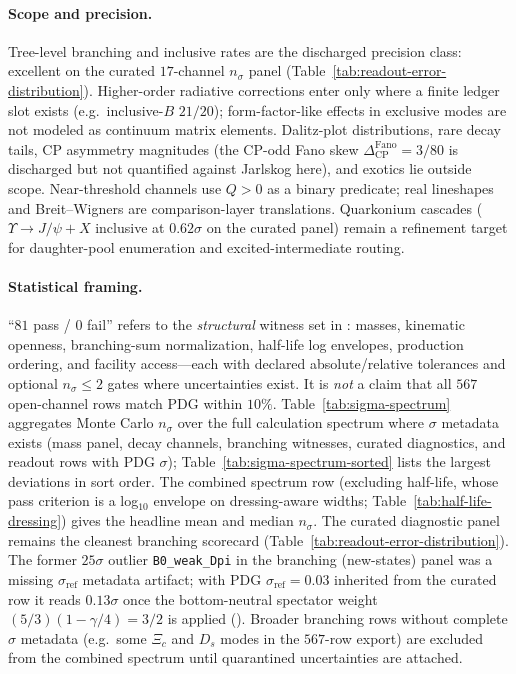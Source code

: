 \documentclass[11pt]{amsart}
\newcommand{\leanid}[1]{{\footnotesize\path{#1}}}
\begin{document}
\paragraph{Scope and precision.}
Tree-level branching and inclusive rates are the discharged precision class:
excellent on the curated $17$-channel $n_\sigma$ panel
(Table~\ref{tab:readout-error-distribution}).
Higher-order radiative corrections enter only where a finite ledger slot exists
(e.g.\ inclusive-$B$ $21/20$); form-factor-like effects in exclusive modes are not
modeled as continuum matrix elements.
Dalitz-plot distributions, rare decay tails, CP asymmetry magnitudes (the CP-odd
Fano skew $\Delta_{\mathrm{CP}}^{\mathrm{Fano}}=3/80$ is discharged but not
quantified against Jarlskog here), and exotics lie outside scope.
Near-threshold channels use $Q>0$ as a binary predicate; real lineshapes and
Breit--Wigners are comparison-layer translations.
Quarkonium cascades ($\Upsilon\to J/\psi+X$ inclusive at $0.62\sigma$ on the
curated panel) remain a refinement target for daughter-pool enumeration and
excited-intermediate routing.

\paragraph{Statistical framing.}
``$81$ pass / $0$ fail'' refers to the \emph{structural} witness set in
: masses, kinematic openness,
branching-sum normalization, half-life log envelopes, production ordering, and
facility access---each with declared absolute/relative tolerances and optional
$n_\sigma\le 2$ gates where uncertainties exist.
It is \emph{not} a claim that all $567$ open-channel rows match PDG within
$10\%$.
Table~\ref{tab:sigma-spectrum} aggregates Monte Carlo $n_\sigma$ over the full
calculation spectrum where $\sigma$ metadata exists (mass panel, decay channels,
branching witnesses, curated diagnostics, and readout rows with PDG $\sigma$);
Table~\ref{tab:sigma-spectrum-sorted} lists the largest deviations in sort order.
The combined spectrum row (excluding half-life, whose pass criterion is a
log$_{10}$ envelope on dressing-aware widths; Table~\ref{tab:half-life-dressing})
gives the headline mean and median $n_\sigma$.
The curated diagnostic panel remains the cleanest branching scorecard
(Table~\ref{tab:readout-error-distribution}).
The former $25\sigma$ outlier \texttt{B0\_weak\_Dpi} in the branching
(new-states) panel was a missing $\sigma_{\mathrm{ref}}$ metadata artifact;
with PDG $\sigma_{\mathrm{ref}}=0.03$ inherited from the curated row it reads
$0.13\sigma$ once the bottom-neutral spectator weight $(5/3)(1-\gamma/4)=3/2$ is
applied (\leanid{spineDischargeWeight\_B0\_D0pi0}).
Broader branching rows without complete $\sigma$ metadata (e.g.\ some
$\Xi_c$ and $D_s$ modes in the $567$-row export) are excluded from the combined
spectrum until quarantined uncertainties are attached.
\end{document}
